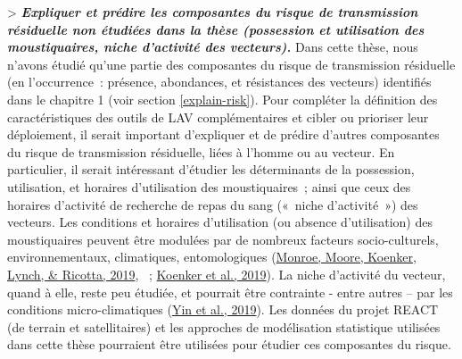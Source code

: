 \documentclass[12pt,twoside]{reedthesis}
\begin{document}
\textgreater{} \textbf{\emph{Expliquer et prédire les composantes du risque de transmission résiduelle non étudiées dans la thèse (possession et utilisation des moustiquaires, niche d'activité des vecteurs).}} Dans cette thèse, nous n'avons étudié qu'une partie des composantes du risque de transmission résiduelle (en l'occurrence~: présence, abondances, et résistances des vecteurs) identifiés dans le chapitre 1 (voir section \ref{explain-risk}). Pour compléter la définition des caractéristiques des outils de LAV complémentaires et cibler ou prioriser leur déploiement, il serait important d'expliquer et de prédire d'autres composantes du risque de transmission résiduelle, liées à l'homme ou au vecteur. En particulier, il serait intéressant d'étudier les déterminants de la possession, utilisation, et horaires d'utilisation des moustiquaires~; ainsi que ceux des horaires d'activité de recherche de repas du sang («~niche d'activité~») des vecteurs. Les conditions et horaires d'utilisation (ou absence d'utilisation) des moustiquaires peuvent être modulées par de nombreux facteurs socio-culturels, environnementaux, climatiques, entomologiques (\protect\hyperlink{ref-monroe_measuring_2019}{Monroe, Moore, Koenker, Lynch, \& Ricotta, 2019}, ~; \protect\hyperlink{ref-koenker_2019}{Koenker et al., 2019}). La niche d'activité du vecteur, quand à elle, reste peu étudiée, et pourrait être contrainte - entre autres -- par les conditions micro-climatiques (\protect\hyperlink{ref-yin_field-based_2019}{Yin et al., 2019}). Les données du projet REACT (de terrain et satellitaires) et les approches de modélisation statistique utilisées dans cette thèse pourraient être utilisées pour étudier ces composantes du risque.\\
\end{document}
